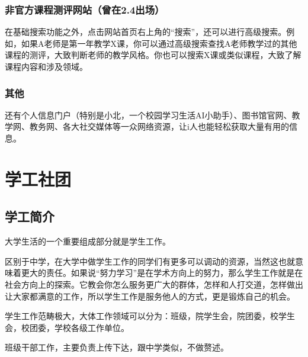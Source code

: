 \documentclass[11pt,oneside]{book}
\begin{document}
\vspace{10pt}

\subsection{非官方课程测评网站（曾在2.4出场）}

\vspace{10pt}

在基础搜索功能之外，点击网站首页右上角的“搜索”，还可以进行高级搜索。例如，如果A老师是第一年教学X课，你可以通过高级搜索查找A老师教学过的其他课程的测评，大致判断老师的教学风格。你也可以搜索X课或类似课程，大致了解课程内容和涉及领域。

\vspace{10pt}

\subsection{其他}

\vspace{10pt}

还有个人信息门户（特别是小北，一个校园学习生活AI小助手）、图书馆官网、教学网、教务网、各大社交媒体等一众网络资源，让i人也能轻松获取大量有用的信息。

\chapter{学工社团}
\section{学工简介}
大学生活的一个重要组成部分就是学生工作。

\vspace{10pt}

区别于中学，在大学中做学生工作的同学们有更多可以调动的资源，当然这也就意味着更大的责任。如果说“努力学习”是在学术方向上的努力，那么学生工作就是在社会方向上的探索。它教会你怎么服务更广大的群体，怎样和人打交道，怎样做出让大家都满意的工作，所以学生工作是服务他人的方式，更是锻炼自己的机会。

\vspace{10pt}

学生工作范畴极大，大体工作领域可以分为：班级，院学生会，院团委，校学生会，校团委，学校各级工作单位。

\vspace{10pt}

班级干部工作，主要负责上传下达，跟中学类似，不做赘述。

\vspace{10pt}
\end{document}
